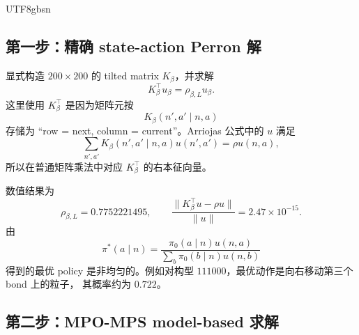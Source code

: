 \documentclass[11pt]{article}
\begin{document}
\begin{CJK*}{UTF8}{gbsn}
\subsection{第一步：精确 state-action Perron 解}

显式构造 \(200\times 200\) 的 tilted matrix \(K_\beta\)，并求解
\begin{equation}
    K_\beta^\top u_\beta=\rho_{\beta,L}u_\beta.
\end{equation}
这里使用 \(K_\beta^\top\) 是因为矩阵元按
\begin{equation}
    K_\beta(n',a'\mid n,a)
\end{equation}
存储为 ``row = next, column = current''。Arriojas 公式中的 \(u\) 满足
\begin{equation}
    \sum_{n',a'}K_\beta(n',a'\mid n,a)u(n',a')
    =
    \rho u(n,a),
\end{equation}
所以在普通矩阵乘法中对应 \(K_\beta^\top\) 的右本征向量。

数值结果为
\begin{equation}
    \rho_{\beta,L}=0.7752221495,
    \qquad
    \frac{\|K_\beta^\top u-\rho u\|}{\|u\|}
    =
    2.47\times 10^{-15}.
\end{equation}
由
\begin{equation}
    \pi^*(a\mid n)
    =
    \frac{\pi_0(a\mid n)u(n,a)}
    {\sum_b\pi_0(b\mid n)u(n,b)}
\end{equation}
得到的最优 policy 是非均匀的。例如对构型 \(111000\)，最优动作是向右移动第三个 bond 上的粒子，
其概率约为 \(0.722\)。

\subsection{第二步：MPO-MPS model-based 求解}


\end{CJK*}
\end{document}
